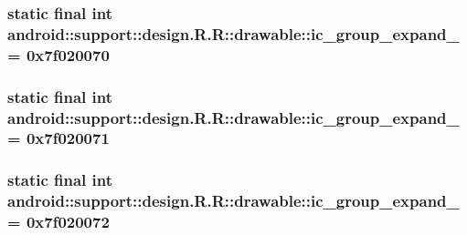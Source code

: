 \hypertarget{classandroid_1_1support_1_1design_1_1_r_1_1drawable_647df88add3f97cb89add0f524711f94}{
\subsubsection[{ic\_\-group\_\-expand\_\-01}]{\setlength{\rightskip}{0pt plus 5cm}static final int android::support::design.R.R::drawable::ic\_\-group\_\-expand\_ = 0x7f020070}}
\label{classandroid_1_1support_1_1design_1_1_r_1_1drawable_647df88add3f97cb89add0f524711f94}


\hypertarget{classandroid_1_1support_1_1design_1_1_r_1_1drawable_804a2dce95d5ea22ae09fe669ee14a70}{
\subsubsection[{ic\_\-group\_\-expand\_\-02}]{\setlength{\rightskip}{0pt plus 5cm}static final int android::support::design.R.R::drawable::ic\_\-group\_\-expand\_ = 0x7f020071}}
\label{classandroid_1_1support_1_1design_1_1_r_1_1drawable_804a2dce95d5ea22ae09fe669ee14a70}


\hypertarget{classandroid_1_1support_1_1design_1_1_r_1_1drawable_e7dd4d594e8fb3df979a895cde78ef37}{
\subsubsection[{ic\_\-group\_\-expand\_\-03}]{\setlength{\rightskip}{0pt plus 5cm}static final int android::support::design.R.R::drawable::ic\_\-group\_\-expand\_ = 0x7f020072}}
\label{classandroid_1_1support_1_1design_1_1_r_1_1drawable_e7dd4d594e8fb3df979a895cde78ef37}


